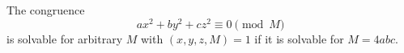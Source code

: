 \begin{proposition}\label{eq:006}
    The congruence
\[
    ax^2+by^2+cz^2\equiv0\pmod M
\]
    is solvable for arbitrary $M$ with $(x,y,z,M)=1$ if it is solvable for $M=4abc$.
\end{proposition}
